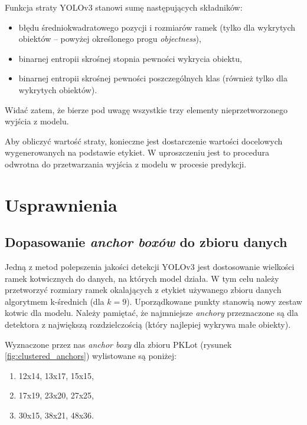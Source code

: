 \documentclass{article}
\begin{document}
Funkcja straty YOLOv3 stanowi sumę następujących składników:

\begin{itemize}
    \item błędu średniokwadratowego pozycji i rozmiarów ramek (tylko dla wykrytych obiektów -- powyżej określonego progu \textit{objectness}),
    \item binarnej entropii skrośnej stopnia pewności wykrycia obiektu,
    \item binarnej entropii skrośnej pewności poszczególnych klas (również tylko dla wykrytych obiektów).
\end{itemize}

Widać zatem, że bierze pod uwagę wszystkie trzy elementy nieprzetworzonego wyjścia z modelu.

Aby obliczyć wartość straty, konieczne jest dostarczenie wartości docelowych wygenerowanych na podstawie etykiet. W uproszczeniu jest to procedura odwrotna do przetwarzania wyjścia z modelu w procesie predykcji.

\section{Usprawnienia}
\label{sec:others}

\subsection{Dopasowanie \textit{anchor boxów} do zbioru danych}

Jedną z metod polepszenia jakości detekcji YOLOv3 jest dostosowanie wielkości ramek kotwicznych do danych, na których model działa. W tym celu należy przetworzyć rozmiary ramek okalających z etykiet używanego zbioru danych algorytmem k-średnich (dla \(k=9\)). Uporządkowane punkty stanowią nowy zestaw kotwic dla modelu. Należy pamiętać, że najmniejsze \textit{anchory} przeznaczone są dla detektora z największą rozdzielczością (który najlepiej wykrywa małe obiekty).

Wyznaczone przez nas \textit{anchor boxy} dla zbioru PKLot (rysunek \ref{fig:clustered_anchors}) wylistowane są poniżej:

\begin{enumerate}
    \item 12x14, 13x17, 15x15,
    \item 17x19, 23x20, 27x25,
    \item 30x15, 38x21, 48x36.
\end{enumerate}
\end{document}
